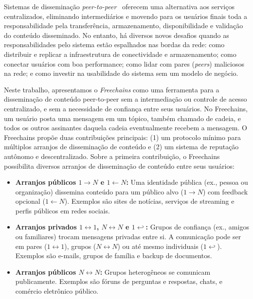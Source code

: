 \documentclass[12pt]{article}
\newcommand{\FC} {Freechains\xspace}
\newcommand{\Xon} {$1{\rightarrow}N$\xspace}
\newcommand{\Xno} {$1{\leftarrow}N$\xspace}
\newcommand{\Xnn} {$N{\leftrightarrow}N$\xspace}
\newcommand{\Xoo} {$1{\leftrightarrow}1$\xspace}
\newcommand{\Xo}  {$1{\hookleftarrow}$\xspace}
\begin{document}
Sistemas de disseminação \emph{peer-to-peer}~\cite{p2p.survey} oferecem uma
alternativa aos serviços centralizados, eliminando intermediários e movendo
para os usuários finais toda a responsabilidade pela transferência,
armazenamento, disponibilidade e validação do conteúdo disseminado.
No entanto, há diversos novos desafios quando as responsabilidades pelo sistema
estão espalhados nas bordas da rede:
    como distribuir e replicar a infraestrutura de conectividade e
    armazenamento;
    como conectar usuários com boa performance;
    como lidar com pares (\emph{peers}) maliciosos na rede;
    e como investir na usabilidade do sistema sem um modelo de negócio.

Neste trabalho, apresentamos o \emph{\FC} como uma ferramenta para a
disseminação de conteúdo peer-to-peer sem a intermediação ou controle de acesso
centralizado, e sem a necessidade de confiança entre seus usuários.
No \FC, um usuário posta uma mensagem em um tópico, também chamado de
cadeia, e todos os outros assinantes daquela cadeia eventualmente recebem a
mensagem.
O \FC propõe duas contribuições principais: (1) um protocolo mínimo para
múltiplos arranjos de disseminação de conteúdo e (2) um sistema de reputação
autônomo e descentralizado.
%
Sobre a primeira contribuição, o \FC possibilita diversos arranjos de
disseminação de conteúdo entre seus usuários:
%
\begin{itemize}
\item \textbf{Arranjos públicos \Xon e \Xno:}
    Uma identidade pública (ex., pessoa ou organização) dissemina conteúdo para
    um público alvo (\Xon) com feedback opcional (\Xno).
    Exemplos são sites de notícias, serviços de streaming e perfis públicos em
    redes sociais.
\item \textbf{Arranjos privados \Xoo, \Xnn e \Xo:}
    Grupos de confiança (ex., amigos ou familiares) trocam mensagens privadas
    entre si.
    A comunicação pode ser em pares (\Xoo), grupos (\Xnn) ou até mesmo
    individuais (\Xo).
    Exemplos são e-mails, grupos de família e backup de documentos.
\item \textbf{Arranjos públicos \Xnn:}
    Grupos heterogêneos se comunicam publicamente. Exemplos são fóruns de
    perguntas e respostas, chats, e comércio eletrônico público.
\end{itemize}
%
\end{document}
